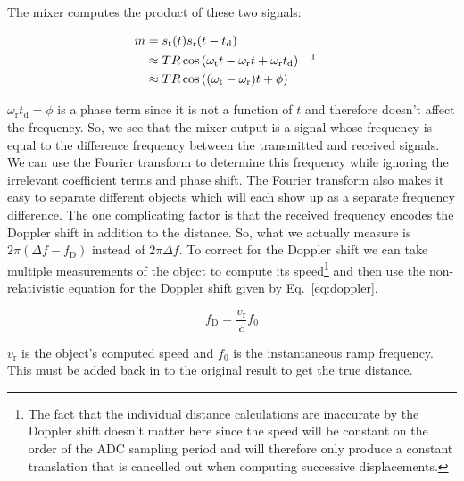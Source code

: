 \documentclass{default}
\begin{document}
The mixer computes the product of these two signals:

\begin{align}
  m &= s_{\text{t}}(t) s_{\text{r}}(t-t_{\text{d}}) \\
    &\approx T R \cos \left( \omega_{\text{t}}t - \omega_{\text{r}}t + \omega_{\text{r}}t_{\text{d}}
      \right) && \text{\footnotemark} \\
    &\approx T R \cos \left( (\omega_{\text{t}} - \omega_{\text{r}})t + \phi \right)
\end{align}

$\omega_{\text{r}}t_{\text{d}} = \phi$ is a phase term since it is not a function of $t$ and
therefore doesn't affect the frequency. So, we see that the mixer output is a signal whose frequency
is equal to the difference frequency between the transmitted and received signals. We can use the
Fourier transform to determine this frequency while ignoring the irrelevant coefficient terms and
phase shift. The Fourier transform also makes it easy to separate different objects which will each
show up as a separate frequency difference. The one complicating factor is that the received
frequency encodes the Doppler shift in addition to the distance. So, what we actually measure is
$2 \pi (\Delta f - f_{\text{D}})$ instead of $2 \pi \Delta f$. To correct for the Doppler shift we
can take multiple measurements of the object to compute its speed\footnote{The fact that the
  individual distance calculations are inaccurate by the Doppler shift doesn't matter here since the
  speed will be constant on the order of the ADC sampling period and will therefore only produce a
  constant translation that is cancelled out when computing successive displacements.} and then use
the non-relativistic equation for the Doppler shift given by Eq.~\ref{eq:doppler}.

\begin{equation}
        \label{eq:doppler}
        f_{\text{D}} = \frac{v_{\text{r}}}{c} f_0
\end{equation}

$v_{\text{r}}$ is the object's computed speed and $f_0$ is the instantaneous ramp frequency. This
must be added back in to the original result to get the true distance. 
\end{document}
